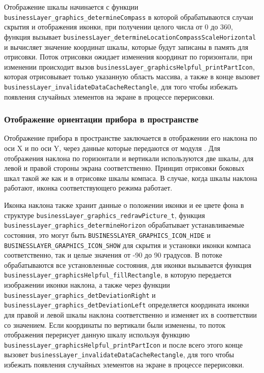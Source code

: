 Отображение шкалы начинается с функции \lstinline{businessLayer_graphics_determineCompass} в которой обрабатываются случаи скрытия и отображения иконки, при получении целого числа
от 0 до 360, функция вызывает \lstinline{businessLayer_determineLocationCompassScaleHorizontal} и вычисляет значение координат шкалы, которые будут записаны в память для отрисовки.
Поток отрисовки ожидает изменения координат по горизонтали, при изменении происходит вызов \lstinline{businessLayer_graphicsHelpful_printPartIcon}, которая отрисовывает только указанную
область массива, а также в конце вызовет \lstinline{businessLayer_invalidateDataCacheRectangle}, для того чтобы избежать появления случайных элементов на экране в процессе перерисовки.

\subsubsection{Отображение ориентации прибора в пространстве}

Отображение прибора в пространстве заключается в отображении его наклона по оси X и по оси Y, через данные которые передаются от модуля \moduleOrientationAzimuth.
Для отображения наклона по горизонтали и вертикали используются две шкалы, для левой и правой стороны экрана соответственно. Принцип отрисовки боковых шкал такой же как
и в отрисовке шкалы компаса. В случае, когда шкалы наклона работают, иконка соответствующего режима работает. 

Иконка наклона также хранит данные о положении иконки и ее цвете фона в структуре \lstinline{businessLayer_graphics_redrawPicture_t}, функция \lstinline{businessLayer_graphics_determineHorizon}
обрабатывает устанавливаемые состояния, это могут быть \lstinline{BUSINESSLAYER_GRAPHICS_ICON_HIDE} и \lstinline{BUSINESSLAYER_GRAPHICS_ICON_SHOW} для скрытия и установки иконки компаса соответственно, 
так и целые значения от -90 до 90 градусов. В потоке обрабатываются все установленные состояния, для иконки вызывается функция \lstinline{businessLayer_graphicsHelpful_fillRectangle}, в которую передается
изображении иконки наклона, а также через функции \lstinline{businessLayer_graphics_detDeviationRight} и \lstinline{businessLayer_graphics_detDeviationLeft} определяется координата иконки
для правой и левой шкалы наклона соответственно и изменяет их в соответствии со значением. Если координаты по вертикали были изменены, то поток отображения перерисует данную шкалу
используя функцию \lstinline{businessLayer_graphicsHelpful_printPartIcon} и после всего этого конце вызовет \lstinline{businessLayer_invalidateDataCacheRectangle},
для того чтобы избежать появления случайных элементов на экране в процессе перерисовки.

